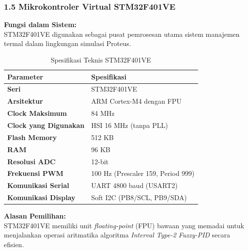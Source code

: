 \documentclass[11pt,a4paper]{article}
\begin{document}
\subsubsection*{1.5 Mikrokontroler Virtual STM32F401VE}
\noindent\textbf{Fungsi dalam Sistem:}\\
STM32F401VE digunakan sebagai pusat pemrosesan utama sistem manajemen termal
dalam lingkungan simulasi Proteus.
\begin{table}[H]
    \centering
    \caption{Spesifikasi Teknis STM32F401VE}
    \label{tab:spesifikasi_stm32}
    \renewcommand{\arraystretch}{1.3}
    \begin{tabular}{>{\bfseries}p{6cm} p{7.5cm}}
        \toprule
        Parameter & Spesifikasi \\
        \midrule
        Seri & STM32F401VE \\
        Arsitektur & ARM Cortex-M4 dengan FPU \\
        Clock Maksimum & 84 MHz \\
        Clock yang Digunakan & HSI 16 MHz (tanpa PLL) \\
        Flash Memory & 512 KB \\
        RAM & 96 KB \\
        Resolusi ADC & 12-bit \\
        Frekuensi PWM & 100 Hz (Prescaler 159, Period 999) \\
        Komunikasi Serial & UART 4800 baud (USART2) \\
        Komunikasi Display & Soft I2C (PB8/SCL, PB9/SDA) \\
        \bottomrule
    \end{tabular}
\end{table}
\vspace{6pt}
\noindent\textbf{Alasan Pemilihan:}\\
STM32F401VE memiliki unit \textit{floating-point} (FPU) bawaan yang memadai
untuk menjalankan operasi aritmatika algoritma \textit{Interval Type-2 Fuzzy-PID}
secara efisien.
\end{document}
